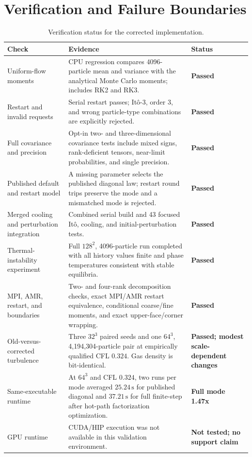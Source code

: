 \documentclass[11pt]{article}
\newcommand{\Ito}{It\^o}
\newcommand{\status}[1]{\textbf{#1}}
\begin{document}
\section{Verification and Failure Boundaries}

\begin{table}[htbp]
\centering
\small
\begin{tabularx}{\textwidth}{@{}p{}X p{}@{}}
\toprule
Check & Evidence & Status \\
\midrule
Uniform-flow moments
& CPU regression compares 4096-particle mean and variance with the analytical
  Monte Carlo moments; includes RK2 and RK3.
& \status{Passed} \\
\addlinespace
Restart and invalid requests
& Serial restart passes; \Ito{}-3, order 3, and wrong particle-type
  combinations are explicitly rejected.
& \status{Passed} \\
\addlinespace
Full covariance and precision
& Opt-in two- and three-dimensional covariance tests include mixed signs,
  rank-deficient tensors, near-limit probabilities, and single precision.
& \status{Passed} \\
\addlinespace
Published default and restart model
& A missing parameter selects the published diagonal law; restart round trips
  preserve the mode and a mismatched mode is rejected.
& \status{Passed} \\
\addlinespace
Merged cooling and perturbation integration
& Combined serial build and 43 focused \Ito{}, cooling, and initial-perturbation
  tests.
& \status{Passed} \\
\addlinespace
Thermal-instability experiment
& Full \(128^2\), 4096-particle run completed with all history values finite and
  phase temperatures consistent with stable equilibria.
& \status{Passed} \\
\addlinespace
MPI, AMR, restart, and boundaries
& Two- and four-rank decomposition checks, exact MPI/AMR restart equivalence,
  conditional coarse/fine moments, and exact upper-face/corner wrapping.
& \status{Passed} \\
\addlinespace
Old-versus-corrected turbulence
& Three \(32^3\) paired seeds and one \(64^3\), 4,194,304-particle pair at
  empirically qualified CFL \(0.324\). Gas density is bit-identical.
& \status{Passed; modest scale-dependent changes} \\
\addlinespace
Same-executable runtime
& At \(64^3\) and CFL \(0.324\), two runs per mode averaged
  \(25.24\,\mathrm{s}\) for published diagonal and \(37.21\,\mathrm{s}\) for
  full finite-step after hot-path factorization optimization.
& \status{Full mode 1.47x} \\
\addlinespace
GPU runtime
& CUDA/HIP execution was not available in this validation environment.
& \status{Not tested; no support claim} \\
\bottomrule
\end{tabularx}
\caption{Verification status for the corrected implementation.}
\end{table}
\end{document}
